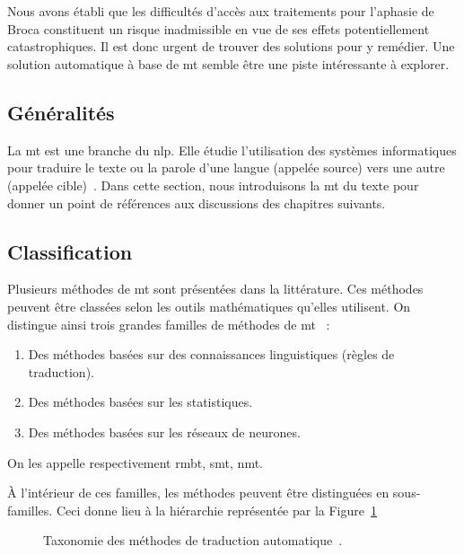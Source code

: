 \section{}

Nous avons établi que les difficultés d'accès aux traitements pour l'aphasie de Broca 
constituent un risque inadmissible en vue de ses effets potentiellement catastrophiques.
Il est donc urgent de trouver des solutions pour y remédier.
Une solution automatique à base de \gls{mt} semble être une piste intéressante à explorer.

\subsection{Généralités}

La \gls{mt} est une branche du \gls{nlp}.
Elle étudie l'utilisation des systèmes informatiques pour traduire le texte ou la parole 
d'une langue (appelée source) vers une autre (appelée cible)~\cite{routledge}.
Dans cette section, nous introduisons la \gls{mt} du texte 
pour donner un point de références aux discussions des chapitres suivants.

\subsection{Classification}

Plusieurs méthodes de \gls{mt} sont présentées dans la littérature.
Ces méthodes peuvent être classées selon les outils mathématiques qu'elles utilisent.
On distingue ainsi trois grandes familles de méthodes de \gls{mt}~\cite{deep-nmt-survey} :
\begin{enumerate}
    \item Des méthodes basées sur des connaissances linguistiques (règles de traduction).
    \item Des méthodes basées sur les statistiques.
    \item Des méthodes basées sur les réseaux de neurones.
\end{enumerate}
On les appelle respectivement \gls{rmbt}, \gls{smt}, \gls{nmt}.

À l'intérieur de ces familles, les méthodes peuvent être distinguées en sous-familles.
Ceci donne lieu à la hiérarchie représentée par la Figure~\ref{fig.mt-taxonomy-tree}
\begin{figure}[hbt]
    \centering
    \resizebox{\textwidth}{!}{ }
    \caption[Taxonomie des méthodes de traduction automatique.]
    {Taxonomie des méthodes de traduction automatique~\cite{deep-nmt-survey,hybrid-mt}.}
    \label{fig.mt-taxonomy-tree}
\end{figure}


